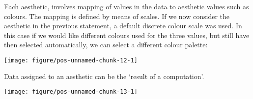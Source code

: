 \documentclass[paper=a4,10pt,div=17,headsepline,BCOR=12mm,twoside,open=right]{scrbook}\usepackage{knitr}
\begin{document}
Each aesthetic, involves mapping of values in the data to aesthetic values such as colours. The mapping is defined by means of scales. If we now consider the  aesthetic in the previous statement, a default discrete colour scale was used. In this case if we would like different colours used for the three values, but still have then selected automatically, we can select a different colour palette:

\begin{knitrout}\footnotesize
{}\color{fgcolor}\begin{kframe}
\begin{alltt}
 \hlstd{(}     \hlstd{=}  \hlopt{+}
  \hlstd{(} \hlstd{=} \hlstd{,}  \hlstd{=} \hlstd{(}\hlstd{))} \hlopt{+}
  \hlstd{(} \hlstd{=} \hlstd{,}  \hlstd{=} \hlstd{)} \hlopt{+}
  \hlstd{()}
\end{alltt}
\end{kframe}

{\centering \texttt{[image: figure/pos-unnamed-chunk-12-1]} 

}



\end{knitrout}

Data assigned to an aesthetic can be the `result of a computation'.

\begin{knitrout}\footnotesize
{}\color{fgcolor}\begin{kframe}
\begin{alltt}
 \hlstd{(} \hlstd{=}    \hlopt{/}  \hlopt{+} \hlstd{()}
\end{alltt}
\end{kframe}

{\centering \texttt{[image: figure/pos-unnamed-chunk-13-1]} 

}



\end{knitrout}
\end{document}
